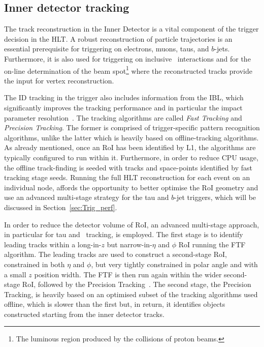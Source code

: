		
		\subsection{Inner detector tracking}
		\label{sec:tracking}

			The track reconstruction in the Inner Detector is a vital component of the trigger decision in the \ac{HLT}. A robust reconstruction of particle trajectories is an essential prerequisite for triggering on electrons, muons, taus, and $b$-jets. Furthermore, it is also used for triggering on inclusive \pp\ interactions and for the on-line determination of the beam spot\footnote{The luminous region produced by the collisions of proton beams.} where the reconstructed tracks provide the input for vertex reconstruction.

			The ID tracking in the trigger also includes information from the IBL, which significantly improves the tracking performance and in particular the impact parameter resolution~\cite{IBLTDR}. The tracking algorithms are called \emph{Fast Tracking} and \emph{Precision Tracking}. The former is comprised of trigger-specific pattern recognition algorithms, unlike the latter which is heavily based on offline-tracking algorithms.
			As already mentioned, once an \ac{RoI} has been identified by \ac{L1}, the algorithms are typically configured to run within it. Furthermore, in order to reduce CPU usage, the offline track-finding is seeded with tracks and space-points identified by fast tracking stage seeds. Running the full \ac{HLT} reconstruction for each event on an individual node, affords the opportunity to better optimise the \ac{RoI} geometry and use an advanced multi-stage strategy for the tau and $b$-jet triggers, which will be discussed in Section~\ref{sec:Trig_perf}. 

			In order to reduce the detector volume of \ac{RoI}, an advanced multi-stage approach, in particular for tau and \bj\ tracking, is employed. The first stage is to identify leading tracks within a long-in-$z$ but narrow-in-$\eta$ and $\phi$ \ac{RoI} running the \ac{FTF} algorithm. The leading tracks are used to construct a second-stage \ac{RoI}, constrained in both $\eta$ and $\phi$, but very tightly constrained in polar angle and with a small $z$ position width. The \ac{FTF} is then run again within the wider second-stage \ac{RoI}, followed by the Precision Tracking~\cite{ATLASTrigger2015,Miano:2016oty}. The second stage, the Precision Tracking, is heavily based on an optimised subset of the tracking algorithms used offline, which is slower than the first but, in return, it identifies objects constructed starting from the inner detector tracks.

